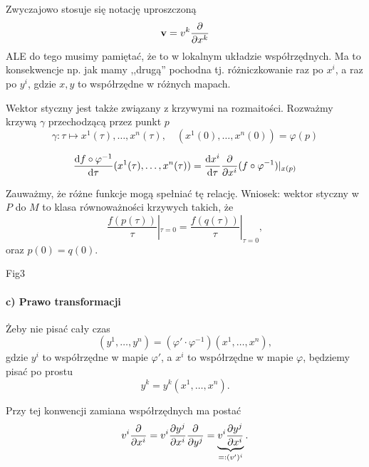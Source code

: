 \documentclass[11pt]{book}
\theoremstyle{definition} %
\theoremstyle{plain} %
\theoremstyle{remark} %
\theoremstyle{underline}
\begin{document}
  Zwyczajowo stosuje się notację uproszczoną
  \begin{displaymath}
    \mathbf{v} = v^k \frac{\partial }{\partial x^k}
  \end{displaymath}
  ALE do tego musimy pamiętać, że to w lokalnym układzie współrzędnych.
  Ma to konsekwencje np. jak mamy ,,drugą'' pochodna tj. różniczkowanie raz po $x^i$, a raz po $y^i$, gdzie $x, y$ 
  to współrzędne w różnych mapach.
  
  Wektor styczny jest także związany z krzywymi na rozmaitości.
  Rozważmy krzywą $\gamma$ przechodzącą przez punkt $p$
  \begin{displaymath}
    \gamma : \tau \mapsto x^1(\tau), \dots, x^n(\tau), \quad (x^1(0), \dots, x^n(0)) = \varphi(p)
  \end{displaymath}
  
  \begin{displaymath}
    \frac{\mathrm{d} f \circ \varphi^{-1}}{\mathrm{d} \tau} ( x^1 (\tau), \dots, x^n(\tau)) 
    = \frac{\mathrm{d} x^i}{\mathrm{d} \tau} \frac{\partial }{\partial x^i} (f \circ \varphi^{-1})|_{x(p)}
  \end{displaymath}

  Zauważmy, że różne funkcje mogą spełniać tę relację.
  Wniosek: wektor styczny w $P$ do $M$ to klasa równoważności krzywych takich, że
  \begin{displaymath}
    \dfrac{f(p(\tau))}{\tau}|_{\tau = 0} = \dfrac{f(q(\tau))}{\tau}|_{\tau = 0},
  \end{displaymath}
  oraz $p(0) = q(0)$.

  \todo Fig3

  \paragraph{c) Prawo transformacji}
  Żeby nie pisać cały czas
  \begin{displaymath}
    (y^1, \dots, y^n) = (\varphi' \cdot \varphi^{-1})(x^1, \dots, x^n), 
  \end{displaymath}
  gdzie $y^i$ to współrzędne w mapie $\varphi'$, a $x^i$ to współrzędne w mapie $\varphi$,
  będziemy pisać po prostu
  \begin{displaymath}
    y^k = y^k(x^1, \dots, x^n).
  \end{displaymath}

  Przy tej konwencji zamiana współrzędnych ma postać
  \begin{displaymath}
    v^i \frac{\partial }{\partial x^i} = v^i\frac{\partial y^j}{\partial x^i} \frac{\partial }{\partial y^j} = \underbrace{ v^i \frac{\partial y^j}{\partial x^i} }_{=: (v')^i}.
  \end{displaymath}
  
\end{document}
